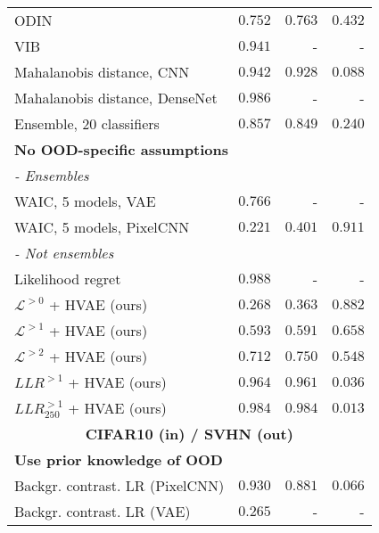{\begin{table}
{\begin{tabular}{lrrr}
ODIN {\parencite{ren_likelihood_2019, liang_enhancing_2018}}                                       & $0.752$ & $0.763$ & $0.432$ \\
VIB \parencite{alemi_uncertainty_2018, choi_waic_2019}                                          & $0.941$ & - & - \\
Mahalanobis distance, CNN {\parencite{ren_likelihood_2019}}                     & $0.942$ & $0.928$ & $0.088$ \\
Mahalanobis distance, DenseNet {\parencite{lee_simple_2018}}                & $0.986$ & - & - \\
Ensemble, 20 classifiers {\parencite{ren_likelihood_2019, lakshminarayanan_simple_2017}}                  & $0.857$ & $0.849$ & $0.240$ \\
         \multicolumn{4}{l}{\textbf{No OOD-specific assumptions}} \\
         \multicolumn{4}{l}{\textit{- Ensembles}} \\
WAIC, 5 models, VAE {\parencite{choi_waic_2019}}                          & $0.766$ & - & - \\
WAIC, 5 models, PixelCNN {\parencite{ren_likelihood_2019}}                      & $0.221$ & $0.401$ & $0.911$ \\
        \multicolumn{4}{l}{\textit{- Not ensembles}} \\
Likelihood regret \parencite{xiao_likelihood_2020}                               & $\mathbf{0.988}$ & - & - \\
$\mathcal{L}^{>0}$ + HVAE (ours)                    & $0.268$ & $0.363$ & $0.882$ \\
$\mathcal{L}^{>1}$ + HVAE (ours)                    & $0.593$ & $0.591$ & $0.658$ \\
$\mathcal{L}^{>2}$ + HVAE (ours)                    & $0.712$ & $0.750$ & $0.548$ \\
$LLR^{>1}$ + HVAE (ours)                            & $0.964$ & $0.961$ & $0.036$ \\
$LLR^{>1}_{250}$ + HVAE (ours)                      & $0.984$ & $\mathbf{0.984}$ & $\mathbf{0.013}$ \\
         \midrule
         \multicolumn{4}{c}{\textbf{CIFAR10 (in) / SVHN (out)}} \\
         \midrule
         \multicolumn{4}{l}{\textbf{Use prior knowledge of OOD}} \\
Backgr. contrast. LR (PixelCNN) {\parencite{ren_likelihood_2019}}               & $0.930$ & $0.881$ & $0.066$ \\
Backgr. contrast. LR (VAE) {\parencite{xiao_likelihood_2020}}                    & $0.265$ & - & - \\

\end{tabular}}
\end{table}}
